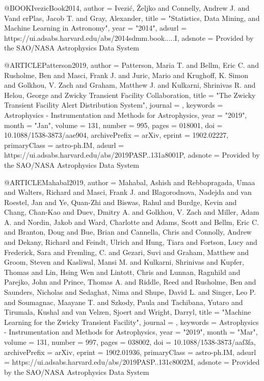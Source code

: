 @BOOK{IvezicBook2014,
       author = {{Ivezi{\'c}}, {\v{Z}}eljko and {Connelly}, Andrew J. and {Vand
        erPlas}, Jacob T. and {Gray}, Alexander},
        title = "{Statistics, Data Mining, and Machine Learning in Astronomy}",
         year = "2014",
       adsurl = {https://ui.adsabs.harvard.edu/abs/2014sdmm.book.....I},
      adsnote = {Provided by the SAO/NASA Astrophysics Data System}
}

@ARTICLE{Patterson2019,
       author = {{Patterson}, Maria T. and {Bellm}, Eric C. and {Rusholme}, Ben and
         {Masci}, Frank J. and {Juric}, Mario and {Krughoff}, K. Simon and
         {Golkhou}, V. Zach and {Graham}, Matthew J. and
         {Kulkarni}, Shrinivas R. and {Helou}, George and
         {Zwicky Transient Facility Collaboration}},
        title = "{The Zwicky Transient Facility Alert Distribution System}",
      journal = {\pasp},
     keywords = {Astrophysics - Instrumentation and Methods for Astrophysics},
         year = "2019",
        month = "Jan",
       volume = {131},
       number = {995},
        pages = {018001},
          doi = {10.1088/1538-3873/aae904},
archivePrefix = {arXiv},
       eprint = {1902.02227},
 primaryClass = {astro-ph.IM},
       adsurl = {https://ui.adsabs.harvard.edu/abs/2019PASP..131a8001P},
      adsnote = {Provided by the SAO/NASA Astrophysics Data System}
}


@ARTICLE{Mahabal2019,
       author = {{Mahabal}, Ashish and {Rebbapragada}, Umaa and {Walters}, Richard and
         {Masci}, Frank J. and {Blagorodnova}, Nadejda and {van Roestel}, Jan and
         {Ye}, Quan-Zhi and {Biswas}, Rahul and {Burdge}, Kevin and
         {Chang}, Chan-Kao and {Duev}, Dmitry A. and {Golkhou}, V. Zach and
         {Miller}, Adam A. and {Nordin}, Jakob and {Ward}, Charlotte and
         {Adams}, Scott and {Bellm}, Eric C. and {Branton}, Doug and
         {Bue}, Brian and {Cannella}, Chris and {Connolly}, Andrew and
         {Dekany}, Richard and {Feindt}, Ulrich and {Hung}, Tiara and
         {Fortson}, Lucy and {Frederick}, Sara and {Fremling}, C. and
         {Gezari}, Suvi and {Graham}, Matthew and {Groom}, Steven and
         {Kasliwal}, Mansi M. and {Kulkarni}, Shrinivas and {Kupfer}, Thomas and
         {Lin}, Hsing Wen and {Lintott}, Chris and {Lunnan}, Ragnhild and
         {Parejko}, John and {Prince}, Thomas A. and {Riddle}, Reed and
         {Rusholme}, Ben and {Saunders}, Nicholas and {Sedaghat}, Nima and
         {Shupe}, David L. and {Singer}, Leo P. and {Soumagnac}, Maayane T. and
         {Szkody}, Paula and {Tachibana}, Yutaro and {Tirumala}, Kushal and
         {van Velzen}, Sjoert and {Wright}, Darryl},
        title = "{Machine Learning for the Zwicky Transient Facility}",
      journal = {\pasp},
     keywords = {Astrophysics - Instrumentation and Methods for Astrophysics},
         year = "2019",
        month = "Mar",
       volume = {131},
       number = {997},
        pages = {038002},
          doi = {10.1088/1538-3873/aaf3fa},
archivePrefix = {arXiv},
       eprint = {1902.01936},
 primaryClass = {astro-ph.IM},
       adsurl = {https://ui.adsabs.harvard.edu/abs/2019PASP..131c8002M},
      adsnote = {Provided by the SAO/NASA Astrophysics Data System}
}


